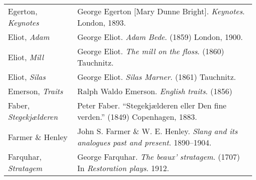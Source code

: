 \begin{longtable}{p{} p{}}
Egerton, \textit{Keynotes} & George Egerton [Mary Dunne Bright]. \textit{Keynotes}. London, 1893. \\
%

Eliot, \textit{Adam} & George Eliot. \textit{Adam Bede}. (1859) London, 1900. \\
Eliot, \textit{Mill} & George Eliot. \textit{The mill on the floss}. (1860) Tauchnitz. \\
Eliot, \textit{Silas} & George Eliot. \textit{Silas Marner}. (1861) Tauchnitz. \\
%
%

Emerson, \textit{Traits} & Ralph Waldo Emerson. \textit{English traits}. (1856) \\
%

Faber, \textit{Stegekjælderen} & Peter Faber. ``Stegekjælderen eller Den fine verden.'' (1849) Copenhagen, 1883. \\ %

Farmer \& Henley & John S. Farmer \& W. E. Henley. \textit{Slang and its analogues past and present}. 1890–1904. \\ %

Farquhar, \textit{Stratagem} & George Farquhar. \textit{The beaux' stratagem}. (1707) In \textit{Restoration plays}. 1912.  \\


\end{longtable}
